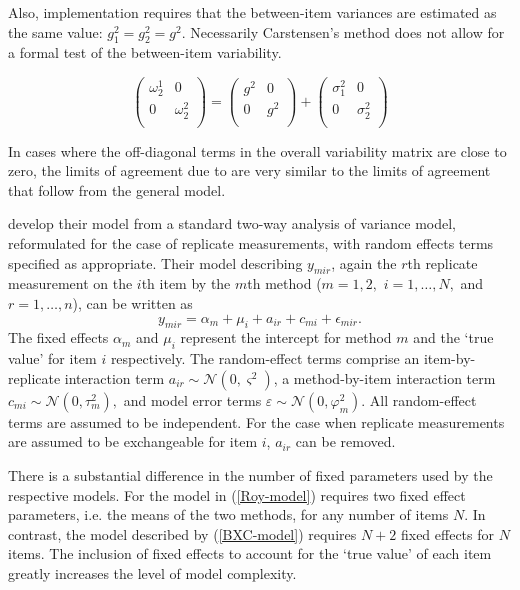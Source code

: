 \documentclass[12pt, a4paper]{article}
\theoremstyle{plain}
\theoremstyle{definition}
\theoremstyle{remark}
\begin{document}
	Also, implementation requires that the between-item variances are
	estimated as the same value: $g^2_1 = g^2_2 = g^2$. Necessarily
	Carstensen's method does not allow for a formal test of the
	between-item variability.
	
	\[\left(\begin{array}{cc}
	\omega^1_2  & 0 \\
	0 & \omega^2_2 \\
	\end{array}  \right)
	=  \left(
	\begin{array}{cc}
	g^2  & 0 \\
	0 & g^2 \\
	\end{array} \right)+
	\left(
	\begin{array}{cc}
	\sigma^2_1  & 0 \\
	0 & \sigma^2_2 \\
	\end{array}\right)
	\]
	
	In cases where the off-diagonal terms in the overall variability
	matrix are close to zero, the limits of agreement due to
	\citet{bxc2008} are very similar to the limits of agreement that
	follow from the general model.
	
	
	
	\citet{BXC2008} develop their model from a standard two-way analysis of variance model, reformulated for the case of replicate measurements, with random effects terms specified as appropriate. 
	Their model describing $y_{mir} $, again the $r$th replicate measurement on the $i$th item by the $m$th method ($m=1,2,$ $i=1,\ldots,N,$ and $r = 1,\ldots,n$), can be written as
	\begin{equation}\label{BXC-model}
	y_{mir}  = \alpha_{m} + \mu_{i} + a_{ir} + c_{mi} + \epsilon_{mir}.
	\end{equation}
	The fixed effects $\alpha_{m}$ and $\mu_{i}$  represent the intercept for method $m$ and the `true value' for item $i$ respectively. The random-effect terms comprise an item-by-replicate interaction term $a_{ir} \sim \mathcal{N}(0,\varsigma^{2})$, a method-by-item interaction term $c_{mi} \sim \mathcal{N}(0,\tau^{2}_{m}),$ and model error terms $\varepsilon \sim \mathcal{N}(0,\varphi^{2}_{m}).$ All random-effect terms are assumed to be independent.
	For the case when replicate measurements are assumed to be exchangeable for item $i$, $a_{ir}$ can be removed.
	
	There is a substantial difference in the number of fixed parameters used by the respective models. For the model in (\ref{Roy-model}) requires two fixed effect parameters, i.e. the means of the two methods, for any number of items $N$. In contrast, the model described by (\ref{BXC-model}) requires $N+2$ fixed effects for $N$ items. The inclusion of fixed effects to account for the `true value' of each item greatly increases the level of model complexity.
	
\end{document}
